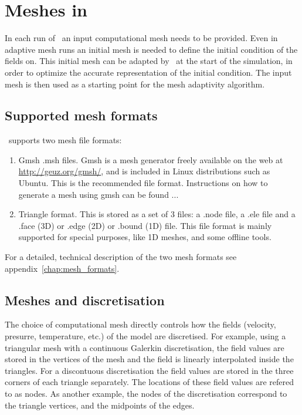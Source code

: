 \chapter{Meshes in \fluidity}\label{chap:meshes}

In each run of \fluidity\ an input computational mesh needs to 
be provided. Even in adaptive mesh runs an initial mesh is needed
to define the initial condition of the fields on. This initial mesh
can be adapted by \fluidity\ at the start of the simulation, 
in order to optimize the accurate representation of the initial 
condition. The input mesh is then used as a starting point for the
mesh adaptivity algorithm.

\section{Supported mesh formats}
\label{sec:supported_mesh_formats}
\fluidity\ supports two mesh file formats:
\begin{enumerate}
\item Gmsh .msh files. Gmsh is a mesh generator freely available on the
web at \url{http://geuz.org/gmsh/}, and is included in Linux distributions 
such as Ubuntu. This is the recommended file format. Instructions on how 
to generate a mesh using gmsh can be found ...
\item Triangle format. This is stored as a set of 3 files: a .node file,
a .ele file and a .face (3D) or .edge (2D) or .bound (1D) file. This file format
is mainly supported for special purposes, like 1D meshes, and some offline 
tools.
\end{enumerate}

For a detailed, technical description of the two mesh formats see 
appendix~\ref{chap:mesh_formats}.

\section{Meshes and discretisation}
The choice of computational mesh directly controls how the fields (velocity,
presurre, temperature, etc.) of the model are discretised. For example, using a
triangular mesh with a \Pone continuous Galerkin discretisation, the field
values are stored in the vertices of the mesh and the field is linearly
interpolated inside the triangles. For a discontuous \PoDG discretisation the
field values are stored in the three corners of each triangle separately. The
locations of these field values are refered to as nodes. As another example, the
nodes of the \Ptwo discretisation correspond to the triangle vertices, and the
midpoints of the edges.

